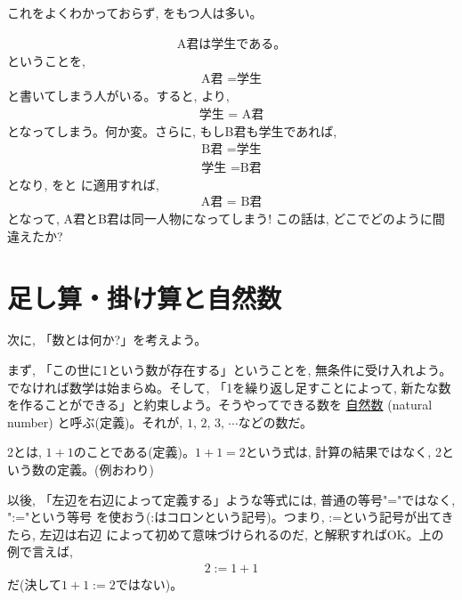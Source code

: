 これをよくわかっておらず, \label{badhabit_equality}
をもつ人は多い。

\begin{q}\label{q:badhabit_equality}
\begin{eqnarray}
\text{A君は学生である。}
\end{eqnarray}
ということを, 
\begin{eqnarray}
\text{A君 $=$学生}\label{eq:badhabit_equality2}
\end{eqnarray}
と書いてしまう人がいる。すると, より, 
\begin{eqnarray}
\text{学生 $=$ A君}\label{eq:badhabit_equality4}
\end{eqnarray}
となってしまう。何か変。さらに, もしB君も学生であれば, 
\begin{eqnarray}
\text{B君 $=$学生}\label{eq:badhabit_equality6}\\
\text{学生 $=$B君}\label{eq:badhabit_equality7}
\end{eqnarray}
となり, をと
に適用すれば, 
\begin{eqnarray}
\text{A君 $=$ B君}\label{eq:badhabit_equality8}
\end{eqnarray}
となって, A君とB君は同一人物になってしまう! この話は, 
どこでどのように間違えたか?\end{q}


\section{足し算・掛け算と自然数}

次に, 「数とは何か?」を考えよう。

まず, 「この世に1という数が存在する」ということを, 無条件に受け入れよう。
でなければ数学は始まらぬ。そして, 「1を繰り返し足すことによって, 
新たな数を作ることができる」と約束しよう。そうやってできる数を
\underline{自然数} (natural number)
と呼ぶ(定義)。それが, $1,\, 2,\, 3,\, \cdots$などの数だ。
\begin{exmpl}
2とは, $1+1$のことである(定義)。$1+1=2$という式は, 
計算の結果ではなく, 2という数の定義。(例おわり)\end{exmpl}\mv

以後, 「左辺を右辺によって定義する」ような等式には, 普通の等号"="ではなく, ":="という等号
を使おう(:はコロンという記号)。つまり, :=という記号が出てきたら, 左辺は右辺
によって初めて意味づけられるのだ, と解釈すればOK。上の例で言えば, 
\begin{eqnarray}
2:=1+1
\end{eqnarray}
だ(決して$1+1:=2$ではない)。\mv

